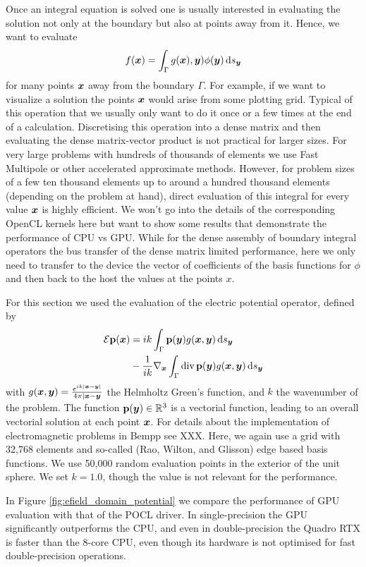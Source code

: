Once an integral equation is solved one is usually interested in evaluating the solution not only at the boundary but also at points away from it. Hence, we want to evaluate
$$
f(\bx) = \int_{\Gamma}g(\bx), \by)\phi(\by) \ds[\by]
$$
for many points $\boldsymbol{x}$ away from the boundary $\Gamma$. For example, if we want to visualize a solution the points $\boldsymbol{x}$ would arise from some plotting grid. Typical of this operation that we usually only want to do it once or a few times at the end of a calculation. Discretising this operation into a dense matrix and then evaluating the dense matrix-vector product is not practical for larger sizes. For very large problems with hundreds of thousands of elements we use Fast Multipole or other accelerated approximate methods. However, for problem sizes of a few ten thousand elements up to around a hundred thousand elements (depending on the problem at hand), direct evaluation of this integral for every value $\boldsymbol{x}$ is highly efficient. We won't go into the details of the corresponding OpenCL kernels here but want to show some results that demonstrate the performance of CPU vs GPU. While for the dense assembly of boundary integral operators the bus transfer of the dense matrix limited performance, here we only need to transfer to the device the vector of coefficients of the basis functions for $\phi$ and then back to the host the values at the points $x$.

For this section we used the evaluation of the electric potential operator, defined by
\begin{align*}
\mathcal{E\mathbf{p}}(\bx) &= ik\int_{\Gamma}\mathbf{p}(\by)g(\bx, \by) \ds[\by]\nonumber\\
&-\frac{1}{ik}\nabla_{\bx}\int_{\Gamma}\text{div}\,\mathbf{p}(\by)g(\bx, \by)\ds[\by]
\end{align*}
with $g(\boldsymbol{x}, \boldsymbol{y}) = \frac{e^{ik|\boldsymbol{x} - \boldsymbol{y}|}}{4\pi|\boldsymbol{x} - \boldsymbol{y}}$ the Helmholtz Green's function, and
$k$ the wavenumber of the problem.
The function $\mathbf{p}(\boldsymbol{y})\in\mathbb{R}^3$ is a vectorial function, leading to an overall vectorial solution at each point $\boldsymbol{x}$. For details about the implementation of electromagnetic problems in Bempp see XXX. Here, we again use a grid with 32,768 elements and so-called (Rao, Wilton, and Glisson) edge based basis functions. We use 50,000 random evaluation points in the exterior of the unit sphere. We set $k=1.0$, though the value is not relevant for the performance.

In Figure \ref{fig:efield_domain_potential} we compare the performance of GPU evaluation with that of the POCL driver. In single-precision the GPU significantly outperforms the CPU, and even in double-precision the Quadro RTX is faster than the 8-core CPU, even though its hardware is not optimised for fast double-precision operations.

